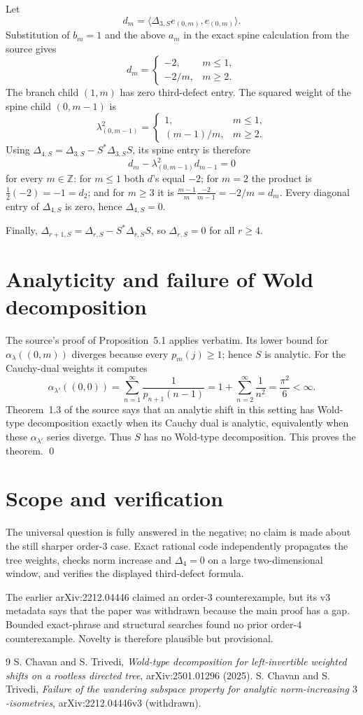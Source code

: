 \documentclass[10pt]{article}
\newcommand{\Z}{\mathbb Z}
\begin{document}
Let
\[
 d_m=\langle\Delta_{3,S}e_{(0,m)},e_{(0,m)}\rangle.
\]
Substitution of $b_m=1$ and the above $a_m$ in the exact spine calculation
from the source gives
\[
 d_m=\begin{cases}-2,&m\leq1,\\-2/m,&m\geq2.
 \end{cases}
\]
The branch child $(1,m)$ has zero third-defect entry.  The squared weight of
the spine child $(0,m-1)$ is
\[
 \lambda_{(0,m-1)}^2=
 \begin{cases}1,&m\leq1,\\(m-1)/m,&m\geq2.
 \end{cases}
\]
Using $\Delta_{4,S}=\Delta_{3,S}-S^*\Delta_{3,S}S$, its spine entry is
therefore
\[
 d_m-\lambda_{(0,m-1)}^2d_{m-1}=0
\]
for every $m\in\Z$: for $m\leq1$ both $d$'s equal $-2$; for $m=2$ the
product is $\tfrac12(-2)=-1=d_2$; and for $m\geq3$ it is
$\frac{m-1}{m}\frac{-2}{m-1}=-2/m=d_m$.  Every diagonal entry of
$\Delta_{4,S}$ is zero, hence $\Delta_{4,S}=0$.

Finally, $\Delta_{r+1,S}=\Delta_{r,S}-S^*\Delta_{r,S}S$, so
$\Delta_{r,S}=0$ for all $r\geq4$.

\section{Analyticity and failure of Wold decomposition}
The source's proof of Proposition~5.1 applies verbatim.  Its lower bound for
$\alpha_\lambda((0,m))$ diverges because every $p_m(j)\geq1$; hence $S$ is
analytic.  For the Cauchy-dual weights it computes
\[
 \alpha_{\lambda'}((0,0))
   =\sum_{n=1}^{\infty}\frac1{p_{n+1}(n-1)}
   =1+\sum_{n=2}^{\infty}\frac1{n^2}
   =\frac{\pi^2}{6}<\infty.
\]
Theorem~1.3 of the source says that an analytic shift in this setting has
Wold-type decomposition exactly when its Cauchy dual is analytic, equivalently
when these $\alpha_{\lambda'}$ series diverge.  Thus $S$ has no Wold-type
decomposition.  This proves the theorem. \qed

\section{Scope and verification}
The universal question is fully answered in the negative; no claim is made
about the still sharper order-$3$ case.  Exact rational code independently
propagates the tree weights, checks norm increase and $\Delta_4=0$ on a large
two-dimensional window, and verifies the displayed third-defect formula.

The earlier arXiv:2212.04446 claimed an order-$3$ counterexample, but its v3
metadata says that the paper was withdrawn because the main proof has a gap.
Bounded exact-phrase and structural searches found no prior order-$4$
counterexample.  Novelty is therefore plausible but provisional.

\begin{thebibliography}{9}
S. Chavan and S. Trivedi,
\emph{Wold-type decomposition for left-invertible weighted shifts on a
rootless directed tree}, arXiv:2501.01296 (2025).
S. Chavan and S. Trivedi,
\emph{Failure of the wandering subspace property for analytic
norm-increasing $3$-isometries}, arXiv:2212.04446v3 (withdrawn).
\end{thebibliography}
\end{document}
